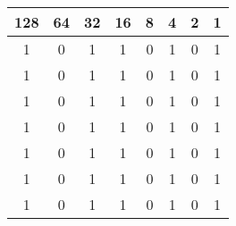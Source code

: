 \documentclass{article}
\begin{document}
\begin{table}[h]
    \centering
    \begin{tabular}{|c|c|c|c|c|c|c|c|}
        \hline
        \cellcolor[gray]{0.8}128&\cellcolor[gray]{0.8}64&\cellcolor[gray]{0.8}32&\cellcolor[gray]{0.8}16&8&4&2&1\\\hline
        \cellcolor[gray]{0.8}1&\cellcolor[gray]{0.8}0&\cellcolor[gray]{0.8}1&\cellcolor[gray]{0.8}1&0&1&0&1\\\hline
        \cellcolor[gray]{0.8}1&\cellcolor[gray]{0.8}0&\cellcolor[gray]{0.8}1&\cellcolor[gray]{0.8}1&0&1&0&1\\\hline
        \cellcolor[gray]{0.8}1&\cellcolor[gray]{0.8}0&\cellcolor[gray]{0.8}1&\cellcolor[gray]{0.8}1&0&1&0&1\\\hline
        1&0&1&1&0&1&0&1\\\hline
        1&0&1&1&0&1&0&1\\\hline
        1&0&1&1&0&1&0&1\\\hline
        1&0&1&1&0&1&0&1\\\hline
    \end{tabular}
\end{table}
\end{document}
